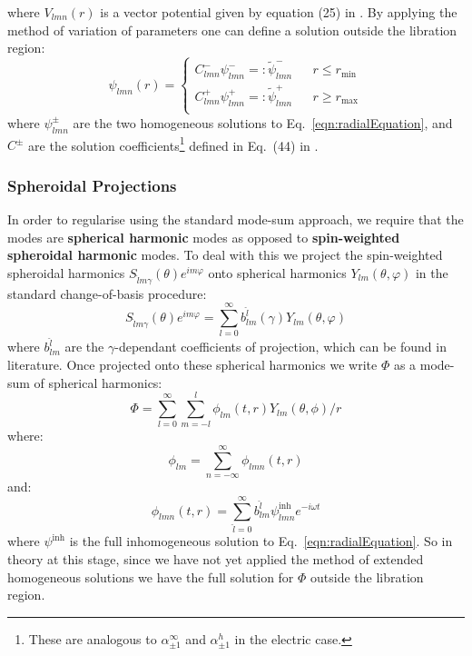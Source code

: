 \documentclass[preprint,showpacs,preprintnumbers,amssymb,superscriptaddress,aps,prd,nofootinbib,11pt]{revtex4-1}
\begin{document}
 where $V_{lmn}(r)$ is a vector potential given by equation (25) in \cite{Warburton_2011}. By applying the method of variation of parameters one can define a solution outside the libration region:
 \begin{equation}
     \psi_{lmn} (r) =  \left\{ \begin{aligned}
         C^-_{lmn} \psi^-_{lmn} =: \tilde{\psi}^-_{lmn} && r\leq r_\text{min}\\
         C^+_{lmn} \psi^+_{lmn} =: \tilde{\psi}^+_{lmn} && r\geq r_\text{max}\\
     \end{aligned}\right.
 \end{equation}
 where $\psi^\pm_{lmn}$ are the two homogeneous solutions to Eq.~\eqref{eqn:radialEquation}, and $C^\pm$ are the solution coefficients\footnote{These are analogous to $\alpha^\infty_{\pm1}$ and $\alpha^h_{\pm1}$ in the electric case.} defined in Eq.~(44) in \cite{Warburton_2011}.
\subsubsection{Spheroidal Projections}
In order to regularise using the standard mode-sum approach, we require that the modes are \textbf{spherical harmonic} modes as opposed to \textbf{spin-weighted spheroidal harmonic} modes. To deal with this we project the spin-weighted spheroidal harmonics $S_{\hat{l}m\gamma}(\theta)e^{im\varphi}$ onto spherical harmonics $Y_{lm}(\theta, \varphi)$ in the standard change-of-basis procedure:
\begin{equation}
    S_{\hat{l}m\gamma}(\theta) e^{im\varphi} = \sum\limits_{l=0}^\infty b^{\hat{l}}_{lm}(\gamma) Y_{lm}(\theta,\varphi)
\end{equation}
where $b^{\hat{l}}_{lm}$ are the $\gamma$-dependant coefficients of projection, which can be found in literature. Once projected onto these spherical harmonics we write $\Phi$ as a mode-sum of spherical harmonics:
\begin{equation}
    \Phi = \sum\limits_{l=0}^\infty \sum\limits_{m=-l}^l \phi_{lm}(t,r) Y_{lm}(\theta,\phi)/r
\end{equation}
where:
\begin{equation}
    \phi_{lm} = \sum\limits_{n=-\infty}^\infty \phi_{lmn}(t,r) 
\end{equation}
and:
\begin{equation}
    \phi_{lmn}(t,r) = \sum_{\hat{l} =0}^\infty b^{\hat{l}}_{lm} \psi^\text{inh}_{\hat{l}mn} e^{-i\omega t}
\end{equation}
where $\psi^\text{inh}$ is the full inhomogeneous solution to Eq.~\eqref{eqn:radialEquation}. So in theory at this stage, since we have not yet applied the method of extended homogeneous solutions we have the full solution for $\Phi$ outside the libration region. 
\end{document}
